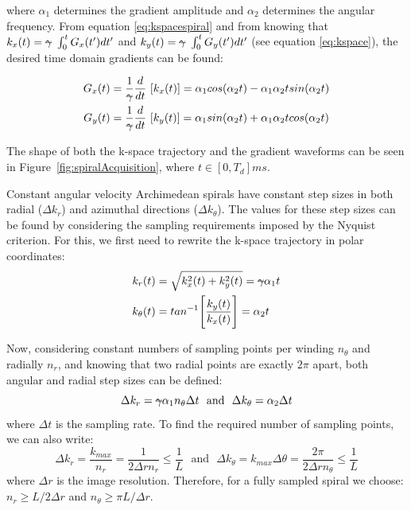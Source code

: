 where $\alpha_1$ determines the gradient amplitude and $\alpha_2$ determines the angular frequency.
From equation \ref{eq:kspacespiral} and from knowing that $k_x(t) = \text{\sout{$\gamma$}} \, \, \int_0^t G_x(t') dt'$ and $k_y(t) = \text{\sout{$\gamma$}} \, \, \int_0^t G_y(t') dt'$ (see equation \ref{eq:kspace}), the desired time domain gradients can be found:

\begin{equation}
    \begin{split}
        G_x(t) &= \frac{1}{\text{\sout{$\gamma$}}} \frac{d}{dt} \,\, [k_x(t)] = \alpha_1 cos (\alpha_2 t) - \alpha_1 \alpha_2 t sin (\alpha_2 t) \\
        G_y(t) &= \frac{1}{\text{\sout{$\gamma$}}} \frac{d}{dt} \,\, [k_y(t)] = \alpha_1 sin (\alpha_2 t) + \alpha_1 \alpha_2 t cos (\alpha_2 t) 
    \end{split}
\end{equation}

The shape of both the k-space trajectory and the gradient waveforms can be seen in Figure~\ref{fig:spiralAcquisition}, where $t \in [0, T_d]ms$.

\hfill

Constant angular velocity Archimedean spirals have constant step sizes in both radial ($\Delta k_r$) and azimuthal directions ($\Delta k_{\theta}$).
The values for these step sizes can be found by considering the sampling requirements imposed by the Nyquist criterion.
For this, we first need to rewrite the k-space trajectory in polar coordinates:
\begin{equation}
    \begin{split}
        k_r(t) &= \sqrt{k_x^2(t) + k_y^2(t)} = \text{\sout{$\gamma$}} \alpha_1 t \\
        k_{\theta}(t) &= tan^{-1} \Bigg[ \frac{k_y(t)}{k_x(t)} \Bigg] = \alpha_2 t
    \end{split}
\end{equation}

Now, considering constant numbers of sampling points per winding $n_{\theta}$ and radially $n_r$, and knowing that two radial points are exactly $2\pi$ apart, both angular and radial step sizes can be defined:
\begin{equation}\label{eq:deltak1}
    \Delta k_r = \text{\sout{$\gamma$}} \alpha_1 n_{\theta} \Delta t  \, \, \text{  and  } \, \, \Delta k_{\theta} = \alpha_2 \Delta t
\end{equation}
where $\Delta t$ is the sampling rate.
To find the required number of sampling points, we can also write:
\begin{equation}\label{eq:deltak2}
    \Delta k_r = \frac{k_{max}}{n_r} = \frac{1}{2 \Delta r n_r} \leq \frac{1}{L} \, \, \text{  and  } \, \,  \Delta k_{\theta} = k_{max} \Delta \theta = \frac{2 \pi}{2 \Delta r n_{\theta}} \leq \frac{1}{L} 
\end{equation}
where $\Delta r$ is the image resolution.
Therefore, for a fully sampled spiral we choose: $n_r \geq L / 2 \Delta r$ and $n_{\theta} \geq \pi L / \Delta r$.

